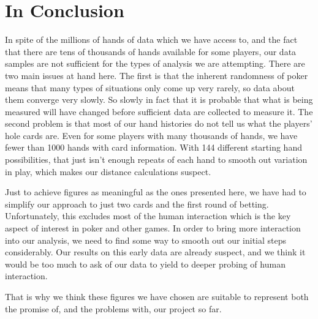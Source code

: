 \documentclass[12pt]{article}
\begin{document}
\newpage

\section*{In Conclusion}

In spite of the millions of hands of data which we have access to, and the fact that there are
tens of thousands of hands available for some players, our data samples are not sufficient for
the types of analysis we are attempting. There are two main issues at hand here. The first is
that the inherent randomness of poker means that many types of situations only come up very
rarely, so data about them converge very slowly. So slowly in fact that it is probable that what
is being measured will have changed before sufficient data are collected to measure it. The second
problem is that most of our hand histories do not tell us what the players' hole cards are. Even
for some players with many thousands of hands, we have fewer than 1000 hands with card information.
With 144 different starting hand possibilities, that just isn't enough repeats of each hand
to smooth out variation in play, which makes our distance calculations suspect.

Just to achieve figures as meaningful as the ones presented here, we have had to simplify
our approach to just two cards and the first round of betting. Unfortunately, this excludes
most of the human interaction which is the key aspect of interest in poker and other games.
In order to bring more interaction into our analysis, we need to find some way to smooth out our
initial steps considerably. Our results on this early data are already suspect, and we think
it would be too much to ask of our data to yield to deeper probing of human interaction.

That is why we think these figures we have chosen are suitable to represent both the promise of,
and the problems with, our project so far.



 
        
  
 
\end{document}
